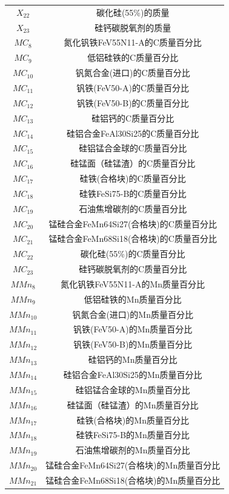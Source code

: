 \documentclass[12pt]{article}%
\begin{document}
\begin{longtable}{|c|c|}
$X_{22}$ & 碳化硅(55\%)的质量 \\
$X_{23}$ & 硅钙碳脱氧剂的质量 \\\hline
$MC_{8}$ & 氮化钒铁FeV55N11-A的C质量百分比 \\
$MC_{9}$ & 低铝硅铁的C质量百分比 \\
$MC_{10}$ & 钒氮合金(进口)的C质量百分比 \\
$MC_{11}$ & 钒铁(FeV50-A)的C质量百分比 \\
$MC_{12}$ & 钒铁(FeV50-B)的C质量百分比 \\
$MC_{13}$ & 硅铝钙的C质量百分比 \\
$MC_{14}$ & 硅铝合金FeAl30Si25的C质量百分比 \\
$MC_{15}$ & 硅铝锰合金球的C质量百分比 \\
$MC_{16}$ & 硅锰面（硅锰渣）的C质量百分比 \\
$MC_{17}$ & 硅铁(合格块)的C质量百分比 \\
$MC_{18}$ & 硅铁FeSi75-B的C质量百分比 \\
$MC_{19}$ & 石油焦增碳剂的C质量百分比 \\
$MC_{20}$ & 锰硅合金FeMn64Si27(合格块)的C质量百分比 \\
$MC_{21}$ & 锰硅合金FeMn68Si18(合格块)的C质量百分比 \\
$MC_{22}$ & 碳化硅(55\%)的C质量百分比 \\
$MC_{23}$ & 硅钙碳脱氧剂的C质量百分比 \\\hline
$MMn_{8}$ & 氮化钒铁FeV55N11-A的Mn质量百分比 \\
$MMn_{9}$ & 低铝硅铁的Mn质量百分比 \\
$MMn_{10}$ & 钒氮合金(进口)的Mn质量百分比 \\
$MMn_{11}$ & 钒铁(FeV50-A)的Mn质量百分比 \\
$MMn_{12}$ & 钒铁(FeV50-B)的Mn质量百分比 \\
$MMn_{13}$ & 硅铝钙的Mn质量百分比 \\
$MMn_{14}$ & 硅铝合金FeAl30Si25的Mn质量百分比 \\
$MMn_{15}$ & 硅铝锰合金球的Mn质量百分比 \\
$MMn_{16}$ & 硅锰面（硅锰渣）的Mn质量百分比 \\
$MMn_{17}$ & 硅铁(合格块)的Mn质量百分比 \\
$MMn_{18}$ & 硅铁FeSi75-B的Mn质量百分比 \\
$MMn_{19}$ & 石油焦增碳剂的Mn质量百分比 \\
$MMn_{20}$ & 锰硅合金FeMn64Si27(合格块)的Mn质量百分比 \\
$MMn_{21}$ & 锰硅合金FeMn68Si18(合格块)的Mn质量百分比 \\

\end{longtable}
\end{document}
